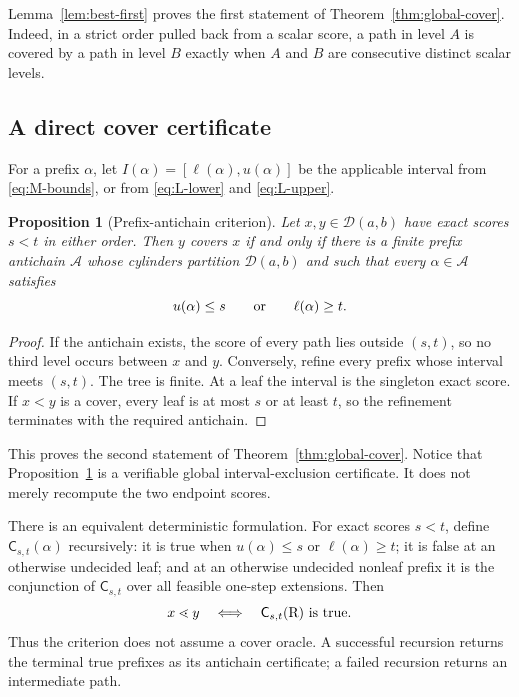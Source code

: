 \documentclass[11pt]{amsart}
\newtheorem{proposition}[theorem]{Proposition}
\theoremstyle{definition}
\newcommand{\RR}{\mathrm{R}}
\newcommand{\cD}{\mathcal D}
\begin{document}
Lemma~\ref{lem:best-first} proves the first statement of
Theorem~\ref{thm:global-cover}.  Indeed, in a strict order pulled back from a
scalar score, a path in level $A$ is covered by a path in level $B$ exactly
when $A$ and $B$ are consecutive distinct scalar levels.

\subsection{A direct cover certificate}

For a prefix $\alpha$, let $I(\alpha)=[\ell(\alpha),u(\alpha)]$ be the
applicable interval from \eqref{eq:M-bounds}, or from
\eqref{eq:L-lower} and \eqref{eq:L-upper}.

\begin{proposition}[Prefix-antichain criterion]\label{prop:antichain}
Let $x,y\in\cD(a,b)$ have exact scores $s<t$ in either order.  Then $y$ covers
$x$ if and only if there is a finite prefix antichain $\mathcal A$ whose
cylinders partition $\cD(a,b)$ and such that every $\alpha\in\mathcal A$
satisfies
\[
  u(\alpha)\leq s
  \qquad\hbox{or}\qquad
  \ell(\alpha)\geq t.
\]
\end{proposition}

\begin{proof}
If the antichain exists, the score of every path lies outside $(s,t)$, so no
third level occurs between $x$ and $y$.  Conversely, refine every prefix whose
interval meets $(s,t)$.  The tree is finite.  At a leaf the interval is the
singleton exact score.  If $x<y$ is a cover, every leaf is at most $s$ or at
least $t$, so the refinement terminates with the required antichain.
\end{proof}

This proves the second statement of Theorem~\ref{thm:global-cover}.  Notice
that Proposition~\ref{prop:antichain} is a verifiable global interval-exclusion
certificate.  It does not merely recompute the two endpoint scores.

There is an equivalent deterministic formulation.  For exact scores $s<t$,
define $\mathsf C_{s,t}(\alpha)$ recursively: it is true when
$u(\alpha)\leq s$ or $\ell(\alpha)\geq t$; it is false at an otherwise
undecided leaf; and at an otherwise undecided nonleaf prefix it is the
conjunction of $\mathsf C_{s,t}$ over all feasible one-step extensions.
Then
\[
  x\lessdot y
  \quad\Longleftrightarrow\quad
  \mathsf C_{s,t}(\RR)\ \hbox{is true}.
\]
Thus the criterion does not assume a cover oracle.  A successful recursion
returns the terminal true prefixes as its antichain certificate; a failed
recursion returns an intermediate path.
\end{document}
